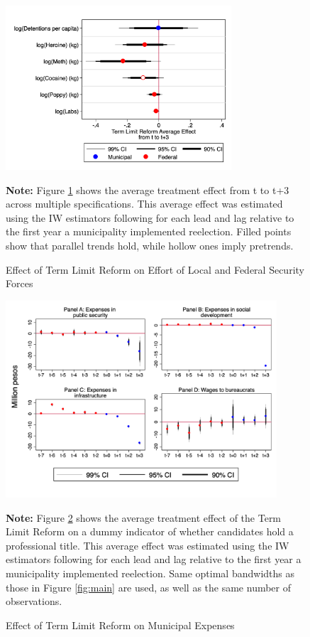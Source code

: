 \documentclass[12pt]{amsart}
\numberwithin{equation}{section}
\theoremstyle{definition}
\theoremstyle{definition}
\theoremstyle{definition}
\begin{document}
\begin{figure}[H]  
\centering
\caption{Effect of Term Limit Reform on Effort of Local and Federal Security Forces} 
\label{fig:effort}

   
\includegraphics[width=0.75\textwidth]{Figures/effort.png}
  
 \textbf{Note:} Figure \ref{fig:effort} shows the average treatment effect from t to t+3 across multiple specifications. This average effect was estimated using the IW estimators following \citet{abraham_sun_2020} for each lead and lag relative to the first year a municipality implemented reelection. Filled points show that parallel trends hold, while hollow ones imply pretrends.        
\end{figure} 

   
 \begin{figure}[h]   
\centering
 \caption{Effect of Term Limit Reform on Municipal Expenses}
 \label{fig:expenses}
\includegraphics[width=0.9\textwidth]{Figures/expenses_allyears.png}
       \captionsetup{justification=centering}
         
 \textbf{Note:} Figure \ref{fig:expenses} shows the average treatment effect of the Term Limit Reform on a dummy indicator of whether candidates hold a professional title. This average effect was estimated using the IW estimators following \citet{abraham_sun_2020} for each lead and lag relative to the first year a municipality implemented reelection. Same optimal bandwidths as those in Figure \ref{fig:main} are used, as well as the same number of observations.  
              
\end{figure}    
\end{document}
